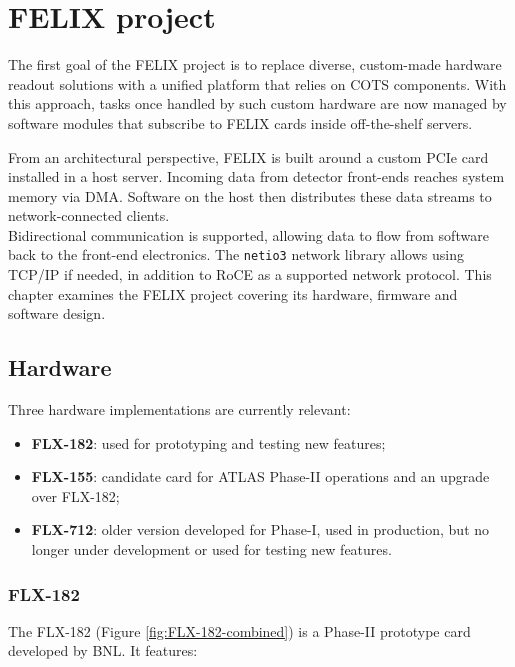 \chapter{\acs{FELIX} project}

The first goal of the \acs{FELIX} project is to replace diverse, custom-made hardware readout solutions with a unified platform that relies on \acf{COTS} components. With this approach, tasks once handled by such custom hardware are now managed by software modules that subscribe to \acs{FELIX} cards inside off-the-shelf servers.

From an architectural perspective, \acs{FELIX} is built around a custom \acs{PCIe} card installed in a host server. Incoming data from detector front-ends reaches system memory via \acf{DMA}. Software on the host then distributes these data streams to network-connected clients.\\
Bidirectional communication is supported, allowing data to flow from software back to the front-end electronics. The \texttt{netio3} network library allows using TCP/IP if needed, in addition to \acf{RoCE} as a supported network protocol. This chapter examines the \acs{FELIX} project covering its hardware, firmware and software design.

\clearpage
\section{Hardware}

Three hardware implementations are currently relevant:

\begin{itemize}
    \item \textbf{FLX-182}: used for prototyping and testing new features;
    
    \item \textbf{FLX-155}: candidate card for \acs{ATLAS} Phase-II operations and an upgrade over FLX-182;
    
    \item \textbf{FLX-712}: older version developed for Phase-I, used in production, but no longer under development or used for testing new features.
\end{itemize}

\subsection{FLX-182}

The FLX-182 \cite{Ilic:2873569} (Figure \ref{fig:FLX-182-combined}) is a Phase-II prototype card developed by \acf{BNL}. It features:

